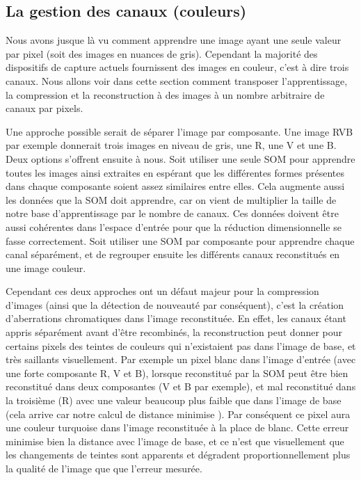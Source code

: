 	\subsection{La gestion des canaux (couleurs)}\label{sec:img:colors}

	Nous avons jusque là vu comment apprendre une image ayant une seule valeur par pixel (soit des images en nuances de gris). Cependant la majorité des dispositifs de capture actuels fournissent des images en couleur, c'est à dire trois canaux. Nous allons voir dans cette section comment transposer l'apprentissage, la compression et la reconstruction à des images à un nombre arbitraire de canaux par pixels.

	Une approche possible serait de séparer l'image par composante. Une image RVB par exemple donnerait trois images en niveau de gris, une R, une V et une B. Deux options s'offrent ensuite à nous. Soit utiliser une seule SOM pour apprendre toutes les images ainsi extraites en espérant que les différentes formes présentes dans chaque composante soient assez similaires entre elles. Cela augmente aussi les données que la SOM doit apprendre, car on vient de multiplier la taille de notre base d'apprentissage par le nombre de canaux. Ces données doivent être aussi cohérentes dans l'espace d'entrée pour que la réduction dimensionnelle se fasse correctement. Soit utiliser une SOM par composante pour apprendre chaque canal séparément, et de regrouper ensuite les différents canaux reconstitués en une image couleur. 
	
	Cependant ces deux approches ont un défaut majeur pour la compression d'images (ainsi que la détection de nouveauté par conséquent), c'est la création d'aberrations chromatiques dans l'image reconstituée. En effet, les canaux étant appris séparément avant d'être recombinés, la reconstruction peut donner pour certains pixels des teintes de couleurs qui n'existaient pas dans l'image de base, et très saillants visuellement. Par exemple un pixel blanc dans l'image d'entrée (avec une forte composante R, V et B), lorsque reconstitué par la SOM peut être bien reconstitué dans deux composantes (V et B par exemple), et mal reconstitué dans la troisième (R) avec une valeur beaucoup plus faible que dans l'image de base (cela arrive car notre calcul de distance minimise ). Par conséquent ce pixel aura une couleur turquoise dans l'image reconstituée à la place de blanc. Cette erreur minimise bien la distance avec l'image de base, et ce n'est que visuellement que les changements de teintes sont apparents et dégradent proportionnellement plus la qualité de l'image que que l'erreur mesurée.

